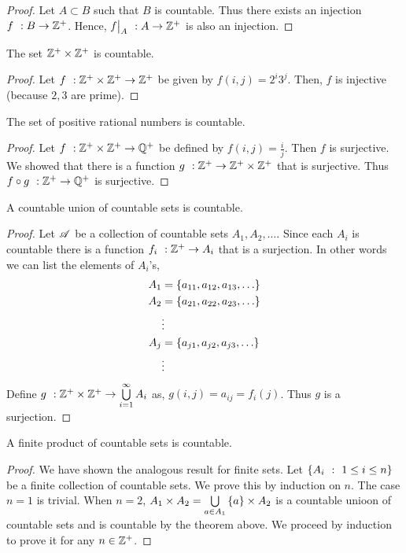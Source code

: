 \begin{proof}
    Let $A \subset B$ such that $B$ is countable. Thus there exists an injection $\map{f}{B}{\Zplus}$. Hence,
    $\map{\restrict{f}{A}}{A}{\Zplus}$ is also an injection.
\end{proof}
\begin{Corollary}
    The set $\Zplus\times\Zplus$ is countable.
\end{Corollary}
\begin{proof}
    Let $\map{f}{\Zplus\times\Zplus}{\Zplus}$ be given by $f(i,j) = 2^{i}3^{j}$. Then, $f$ is injective
    (because $2,3$ are prime).
\end{proof}
\begin{Corollary}
    The set of positive rational numbers is countable.
\end{Corollary}
\begin{proof}
    Let $\map{f}{\Zplus\times\Zplus}{\Q^{+}}$ be defined by $f(i,j) = \frac{i}{j}$. Then $f$ is surjective.
    We showed that there is a function $\map{g}{\Zplus}{\Zplus\times\Zplus}$ that is surjective. Thus
    $\map{\fog{f}{g}}{\Zplus}{\Q^{+}}$ is surjective.
\end{proof}
\begin{Theorem}
    A countable union of countable sets is countable.
\end{Theorem}
\begin{proof}
    Let $\famA$ be a collection of countable sets $A_1,A_2,\ldots$. Since each $A_i$ is countable there is a
    function $\map{f_i}{\Zplus}{A_i}$ that is a surjection. In other words we can list the elements of $A_i$'s,
    \begin{align*}
	A_1 &= \setX{a_{11},a_{12},a_{13},\ldots}\\
	A_2 &= \setX{a_{21},a_{22},a_{23},\ldots}\\
	&\vdots\\
	A_j &= \setX{a_{j1},a_{j2},a_{j3},\ldots}\\
	&\vdots
    \end{align*}
    Define $\map{g}{\Zplus\times\Zplus}{\countUnion{A_i}{i}}$ as,
    $g(i,j) = a_{ij} = f_i(j)$. Thus $g$ is a surjection.
\end{proof}
\begin{Theorem}
    A finite product of countable sets is countable.
\end{Theorem}
\begin{proof}
    We have shown the analogous result for finite sets. Let $\set{A_i}{1\leq i \leq n}$ be a finite collection
    of countable sets. We prove this by induction on $n$. The case $n= 1$ is trivial. When $n = 2$,
    $A_1\times A_2 = \bigcup\limits_{a\in A_1}\setX{a}\times A_2$ is a countable unioon of countable sets and
    is countable by the theorem above. We proceed by induction to prove it for any $n \in \Zplus$.
\end{proof}
